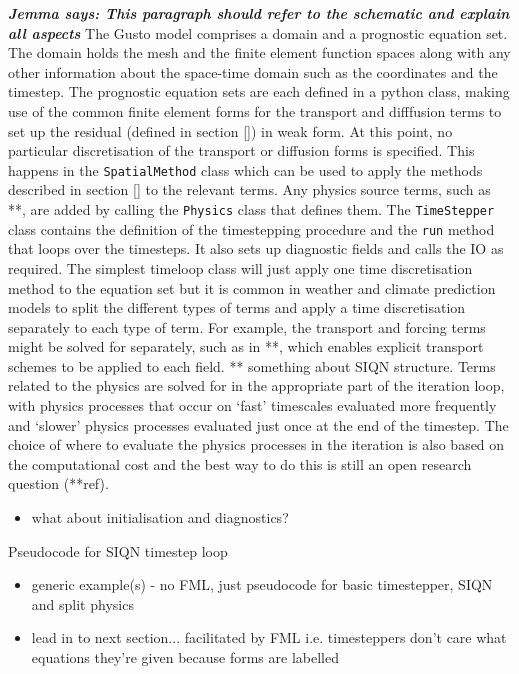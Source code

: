 \documentclass[journal abbreviation, manuscript]{copernicus}
\newcommand{\JScomment}[1]{\textit{\textbf{Jemma says: #1}}}
\begin{document}
\JScomment{This paragraph should refer to the schematic and explain
  all aspects} The Gusto model comprises a domain and a prognostic
equation set. The domain holds the mesh and the finite element
function spaces along with any other information about the space-time
domain such as the coordinates and the timestep. The prognostic
equation sets are each defined in a python class, making use of the
common finite element forms for the transport and difffusion terms to
set up the residual (defined in section \ref{}) in weak form. At this
point, no particular discretisation of the transport or diffusion
forms is specified. This happens in the \texttt{SpatialMethod} class
which can be used to apply the methods described in section \ref{} to
the relevant terms. Any physics source terms, such as **, are added by
calling the \texttt{Physics} class that defines them. The
\texttt{TimeStepper} class contains the definition of the timestepping
procedure and the \texttt{run} method that loops over the
timesteps. It also sets up diagnostic fields and calls the IO as
required. The simplest timeloop class will just apply one time
discretisation method to the equation set but it is common in weather
and climate prediction models to split the different types of terms
and apply a time discretisation separately to each type of term. For
example, the transport and forcing terms might be solved for
separately, such as in **, which enables explicit transport schemes to
be applied to each field. ** something about SIQN structure. Terms
related to the physics are solved for in the appropriate part of the
iteration loop, with physics processes that occur on `fast' timescales
evaluated more frequently and `slower' physics processes evaluated
just once at the end of the timestep. The choice of where to evaluate
the physics processes in the iteration is also based on the
computational cost and the best way to do this is still an open
research question (**ref).

\begin{itemize}
\item what about initialisation and diagnostics?
\end{itemize}

\begin{algorithm}
  \caption{Pseudocode for SIQN timestep loop}\label{alg:SIQN}
  \begin{algorithmic}
    \STATE
  \end{algorithmic}
\end{algorithm}

\begin{itemize}
\item generic example(s) - no FML, just pseudocode for basic
  timestepper, SIQN and split physics
\item lead in to next section... facilitated by FML i.e. timesteppers don't care what equations they're given because forms are labelled
\end{itemize}
\end{document}

